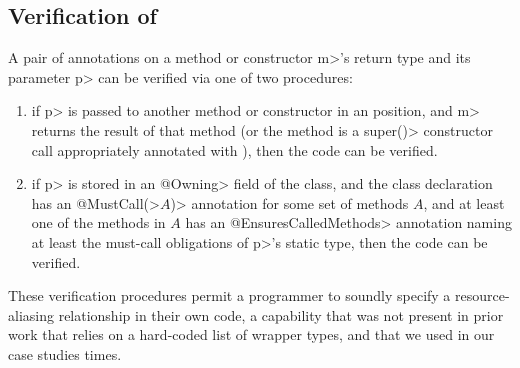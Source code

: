 \subsection{Verification of \mccannot}

A pair of \mccannot annotations on a method or constructor \<m>'s return type
and its parameter \<p> can be verified via one of two
procedures:
\begin{enumerate}
\item if \<p> is passed to another method or constructor in an
  \mccannot position, and \<m> returns the result of that method
  (or the method is a \<super()> constructor call appropriately annotated
  with \mccannot), then the code can be verified.
\item if \<p> is stored in an \<@Owning> field of the class, and the
  class declaration has an \<@MustCall(>$A$\<)> annotation for some set
  of methods $A$, and at least one of the methods in $A$ has an
  \<@EnsuresCalledMethods> annotation naming at least the
  must-call obligations of \<p>'s static type, then the code can be verified.
\end{enumerate}
These verification procedures permit a programmer to soundly specify a resource-aliasing
relationship in their own code, a capability that was not present in prior work
that relies on a hard-coded list of wrapper types, and that we used in our case studies
 times.



